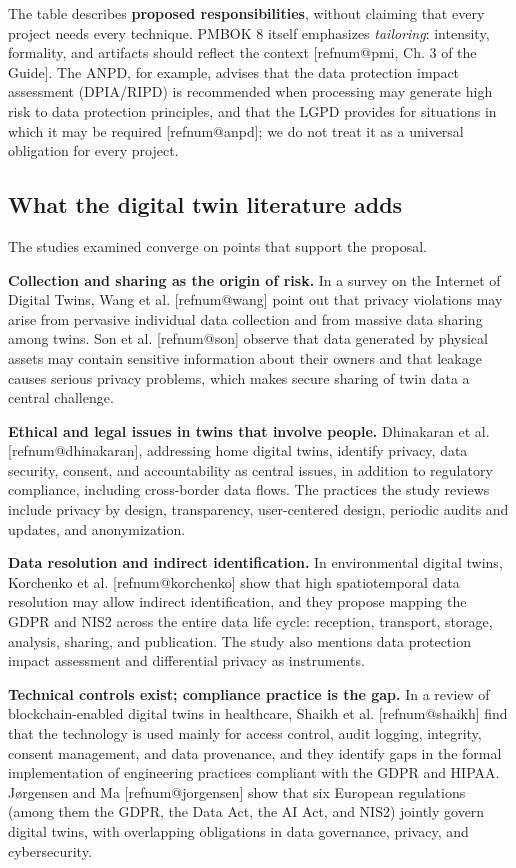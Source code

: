 \documentclass[12pt,a4paper,article,oneside,brazil,english]{abntex2}
\makeatletter
\newcommand{\refnum}[1]{\csname refnum@#1\endcsname}
\makeatother
\begin{document}
The table describes \textbf{proposed responsibilities}, without claiming that every project needs every technique. PMBOK 8 itself emphasizes \textit{tailoring}: intensity, formality, and artifacts should reflect the context [\refnum{pmi}, Ch. 3 of the Guide]. The ANPD, for example, advises that the data protection impact assessment (DPIA/RIPD) is recommended when processing may generate high risk to data protection principles, and that the LGPD provides for situations in which it may be required [\refnum{anpd}]; we do not treat it as a universal obligation for every project.
\subsection{What the digital twin literature adds}

The studies examined converge on points that support the proposal.

\textbf{Collection and sharing as the origin of risk.} In a survey on the Internet of Digital Twins, Wang et al. [\refnum{wang}] point out that privacy violations may arise from pervasive individual data collection and from massive data sharing among twins. Son et al. [\refnum{son}] observe that data generated by physical assets may contain sensitive information about their owners and that leakage causes serious privacy problems, which makes secure sharing of twin data a central challenge.

\textbf{Ethical and legal issues in twins that involve people.} Dhinakaran et al. [\refnum{dhinakaran}], addressing home digital twins, identify privacy, data security, consent, and accountability as central issues, in addition to regulatory compliance, including cross-border data flows. The practices the study reviews include privacy by design, transparency, user-centered design, periodic audits and updates, and anonymization.

\textbf{Data resolution and indirect identification.} In environmental digital twins, Korchenko et al. [\refnum{korchenko}] show that high spatiotemporal data resolution may allow indirect identification, and they propose mapping the GDPR and NIS2 across the entire data life cycle: reception, transport, storage, analysis, sharing, and publication. The study also mentions data protection impact assessment and differential privacy as instruments.

\textbf{Technical controls exist; compliance practice is the gap.} In a review of blockchain-enabled digital twins in healthcare, Shaikh et al. [\refnum{shaikh}] find that the technology is used mainly for access control, audit logging, integrity, consent management, and data provenance, and they identify gaps in the formal implementation of engineering practices compliant with the GDPR and HIPAA. Jørgensen and Ma [\refnum{jorgensen}] show that six European regulations (among them the GDPR, the Data Act, the AI Act, and NIS2) jointly govern digital twins, with overlapping obligations in data governance, privacy, and cybersecurity.
\end{document}
